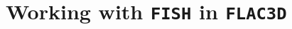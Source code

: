 \documentclass[a4paper, nobind]{templates/ociamthesis}
\begin{document}
\begin{romanpages}

\maketitle




%	

  \dominitoc %

\flushbottom

\tableofcontents



\end{romanpages}

\flushbottom

\minitoc

\newpage

\hypertarget{working-with-fish-in-flac3d}{%
\chapter{\texorpdfstring{Working with \texttt{FISH} in \texttt{FLAC3D}}{Working with FISH in FLAC3D}}\label{working-with-fish-in-flac3d}}
\end{document}

